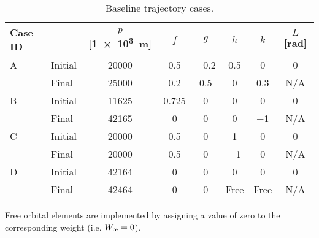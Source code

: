 \begin{table}[H]
  \centering
  \begin{tabular}{llcccccc}
    \toprule
    \textbf{Case ID} &         & \(p\) [\qty{1e3}{m}] & \(f\)     & \(g\)      & \(h\)     & \(k\)     & \(L\) [\unit{rad}] \\
    \midrule
    A                & Initial & \num{20000}          & \num{0.5} & \num{-0.2} & \num{0.5} & \num{0}   & \num{0}            \\
                     & Final   & \num{25000}          & \num{0.2} & \num{0.5}  & \num{0}   & \num{0.3} & N/A                \\
    B                & Initial & \num{11625}          & 0.725     & 0          & 0         & 0         & 0                  \\
                     & Final   & \num{42165}          & 0         & 0          & 0         & \num{-1}  & N/A                \\
    C                & Initial & \num{20000}          & 0.5       & 0          & 1         & 0         & 0                  \\                    & Final & \num{20000} & 0.5 & 0 & \num{-1} & 0 & N/A\\
    D                & Initial & \num{42164}          & 0         & 0          & 0         & 0         & 0                  \\
                     & Final   & \num{42464}          & 0         & 0          & Free      & Free      & N/A                \\

    \bottomrule
  \end{tabular}
  \caption{Baseline trajectory cases.}
  \label{tab:trajectory_cases}
\end{table}
Free orbital elements are implemented by assigning a value of zero to the corresponding weight (i.e. \(W_{\moe} = 0\)).

